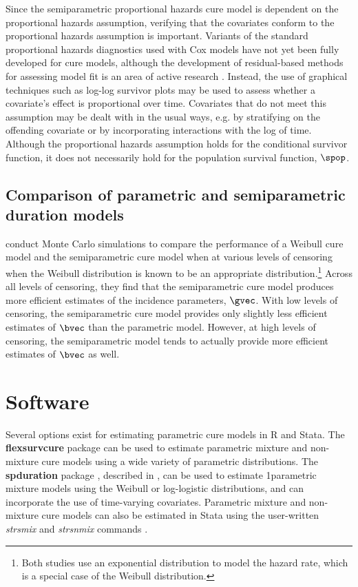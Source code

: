 \documentclass[letterpaper, 12pt]{article}
\theoremstyle{plain}
\begin{document}
Since the semiparametric proportional hazards cure model is dependent on the proportional hazards assumption, verifying that the covariates conform to the proportional hazards assumption is important. 
Variants of the standard proportional hazards diagnostics used with Cox models have not yet been fully developed for cure models, although the development of residual-based methods for assessing model fit is an area of active research \citep{peng2017, ramires2018}. Instead, the use of graphical techniques such as log-log survivor plots may be used to assess whether a covariate's effect is proportional over time. Covariates that do not meet this assumption may be dealt with in the usual ways, e.g. by stratifying on the offending covariate or by incorporating interactions with the log of time. Although the proportional hazards assumption holds for the conditional survivor function, it does not necessarily hold for the population survival function, $\spop$.
		
\subsection{Comparison of parametric and semiparametric duration models}
\citet{kuk1992, sy2000} conduct Monte Carlo simulations to compare the performance of a Weibull cure model and the semiparametric cure model when at various levels of censoring when the Weibull distribution is known to be an appropriate distribution.\footnote{Both studies use an exponential distribution to model the hazard rate, which is a special case of the Weibull distribution.} Across all levels of censoring, they find that the semiparametric cure model produces more efficient estimates of the incidence parameters, $\gvec$. With low levels of censoring, the semiparametric cure model provides only slightly less efficient estimates of $\bvec$ than the parametric model. However, at high levels of censoring, the semiparametric model tends to actually provide more efficient estimates of $\bvec$ as well.

\section{Software}
		Several options exist for estimating parametric cure models in R and Stata. The \textbf{flexsurvcure} package \citep{amdahl2017} can be used to estimate parametric mixture and non-mixture cure models using a wide variety of parametric distributions. The \textbf{spduration} package \citep{beger2017a}, described in \citep{beger2017a}, can be used to estimate 1parametric mixture models using the Weibull or log-logistic distributions, and can incorporate the use of time-varying covariates. Parametric mixture and non-mixture cure models can also be estimated in Stata using the user-written \textit{strsmix} and \textit{strsnmix} commands \citep{lambert2007}.
		
\end{document}
